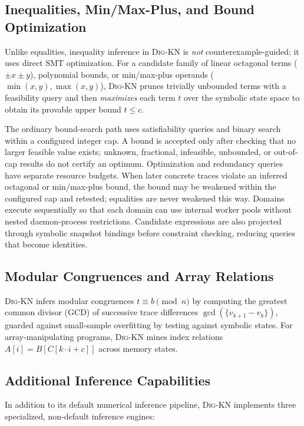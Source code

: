 \documentclass[runningheads]{llncs}
\newcommand{\tool}{\textsc{Dig-KN}\xspace}
\begin{document}
\subsection{Inequalities, Min/Max-Plus, and Bound Optimization}
\label{sec:ineqs}
Unlike equalities, inequality inference in \tool{} is \emph{not} counterexample-guided; it uses direct SMT optimization.  For a candidate family of linear octagonal terms ($\pm x \pm y$), polynomial bounds, or min/max-plus operands ($\min(x,y), \max(x,y)$), \tool{} prunes trivially unbounded terms with a feasibility query and then \emph{maximizes} each term $t$ over the symbolic state space to obtain its provable upper bound $t \le c$.

The ordinary bound-search path uses satisfiability queries and binary search within a configured integer cap.  A bound is accepted only after checking that no larger feasible value exists; unknown, fractional, infeasible, unbounded, or out-of-cap results do not certify an optimum.  Optimization and redundancy queries have separate resource budgets.  When later concrete traces violate an inferred octagonal or min/max-plus bound, the bound may be weakened within the configured cap and retested; equalities are never weakened this way.  Domains execute sequentially so that each domain can use internal worker pools without nested daemon-process restrictions.  Candidate expressions are also projected through symbolic snapshot bindings before constraint checking, reducing queries that become identities.

\subsection{Modular Congruences and Array Relations}
\label{sec:congruences}
\tool{} infers modular congruences $t \equiv b \pmod n$ by computing the greatest common divisor (GCD) of successive trace differences $\gcd(\{v_{k+1} - v_k\})$, guarded against small-sample overfitting by testing against symbolic states.  For array-manipulating programs, \tool{} mines index relations $A[i] = B[C[k\cdot i + c]]$ across memory states.

\subsection{Additional Inference Capabilities}
\label{sec:additional_inf}
In addition to its default numerical inference pipeline, \tool{} implements three specialized, non-default inference engines:
\end{document}
